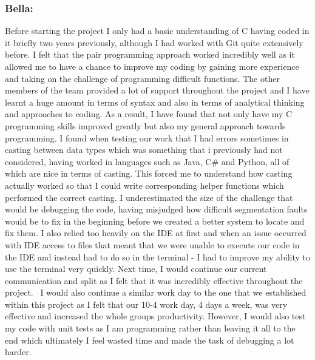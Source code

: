 \documentclass[11pt]{article}
\begin{document}
\hypertarget{h.nvh7vvlf6lpp}{%
\subsubsection{\texorpdfstring{{Bella:
}}{Bella: }}\label{h.nvh7vvlf6lpp}}

{Before starting the project I only had a basic understanding of C
having coded in it briefly two years previously, although I had worked
with Git quite extensively before. I felt that the pair programming
approach worked incredibly well as it allowed me to have a chance to
improve my coding by gaining more experience and taking on the challenge
of programming difficult functions. The other members of the team
provided a lot of support throughout the project and I have learnt a
huge amount in terms of syntax and also in terms of analytical thinking
and approaches to coding. As a result, I have found that not only have
my C programming skills improved greatly but also my general approach
towards programming. I found when testing our work that I had errors
sometimes in casting between data types which was something that i
previously had not considered, having worked in languages such as Java,
C\# and Python, all of which are nice in terms of casting. This forced
me to understand how casting actually worked so that I could write
corresponding helper functions which performed the correct casting. I
underestimated the size of the challenge that would be debugging the
code, having misjudged how difficult segmentation faults would be to fix
in the beginning before we created a better system to locate and fix
them. I also relied too heavily on the IDE at first and when an issue
occurred with IDE access to files that meant that we were unable to
execute our code in the IDE and instead had to do so in the terminal - I
had to improve my ability to use the terminal very quickly. Next time, I
would continue our current communication and split as I felt that it was
incredibly effective throughout the project. ~I would also continue a
similar work day to the one that we established within this project as I
felt that our 10-4 work day, 4 days a week, was very effective and
increased the whole group\textquotesingle s productivity. However, I
would also test my code with unit tests as I am programming rather than
leaving it all to the end which ultimately I feel wasted time and made
the task of debugging a lot harder.}
\end{document}
